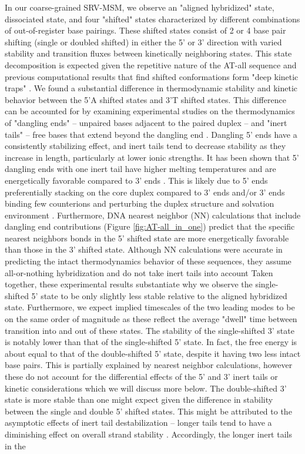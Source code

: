\documentclass[journal=jpcbfk,manuscript=article]{achemso}
\begin{document}
In our coarse-grained SRV-MSM, we observe an "aligned hybridized" state, dissociated state, and four "shifted" states characterized by different combinations of out-of-register base pairings. These shifted states consist of 2 or 4 base pair shifting (single or doubled shifted) in either the 5' or 3' direction with varied stability and transition fluxes between kinetically neighboring states. This state decomposition is expected given the repetitive nature of the AT-all sequence and previous computational results that find shifted conformations form "deep kinetic traps" \citep{Xiao2019, Phys2014}. We found a substantial difference in thermodynamic stability and kinetic behavior between the 5'A shifted states and 3'T shifted states. This difference can be accounted for by examining experimental studies on the thermodynamics of "dangling ends" -- unpaired bases adjacent to the paired duplex -- and "inert tails" -- free bases that extend beyond the dangling end \citep{Michele2014EHybridization}. Dangling 5' ends have a consistently stabilizing effect, and inert tails tend to decrease stability as they increase in length, particularly at lower ionic strengths. It has been shown that 5' dangling ends with one inert tail have higher melting temperatures and are energetically favorable compared to 3' ends \citep{Senior1988InfluenceDuplexes, Dickman2012ThermodynamicDNAs}. This is likely due to 5' ends preferentially stacking on the core duplex compared to 3' ends and/or 3' ends binding few counterions and perturbing the duplex structure and solvation environment \citep{Doktycz1990ThermodynamicATGC}. Furthermore, DNA nearest neighbor (NN) calculations that include dangling end contributions (Figure \ref{fig:AT-all_in_one}) predict that the specific nearest neighbors bonds in the 5' shifted state are more energetically favorable than those in the 3' shifted state. Although NN calculations were accurate in predicting the intact thermodynamics behavior of these sequences, they assume all-or-nothing hybridization and do not take inert tails into account \citep{Santalucia2004TM, SantaLucia1998AThermodynamics} Taken together, these experimental results substantiate why we observe the single-shifted 5' state to be only slightly less stable relative to the aligned hybridized state. Furthermore, we expect implied timescales of the two leading modes to be on the same order of magnitude as these reflect the average "dwell" time between transition into and out of these states. The stability of the single-shifted 3' state is notably lower than that of the single-shifted 5' state. In fact, the free energy is about equal to that of the double-shifted 5' state, despite it having two less intact base pairs. This is partially explained by nearest neighbor calculations, however these do not account for the differential effects of the 5' and 3' inert tails or kinetic considerations which we will discuss more below. The double-shifted 3' state is more stable than one might expect given the difference in stability between the single and double 5' shifted states. This might be attributed to the asymptotic effects of inert tail destabilization -- longer tails tend to have a diminishing effect on overall strand stability \citep{Michele2014EHybridization}. Accordingly, the longer inert tails in the 
\end{document}
